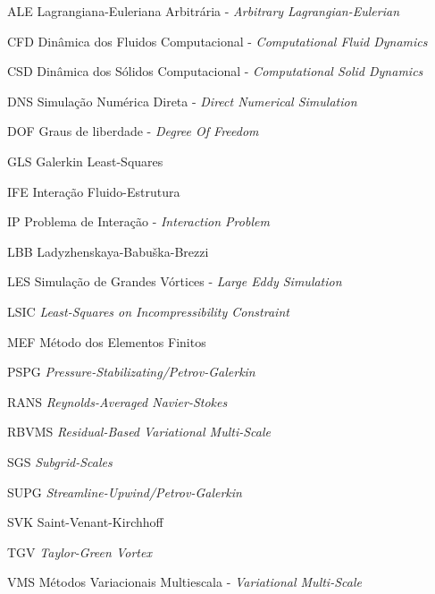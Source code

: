 \begin{siglas}
    \item[ALE] Lagrangiana-Euleriana Arbitrária - \textit{Arbitrary Lagrangian-Eulerian}
    \item[CFD] Dinâmica dos Fluidos Computacional - \textit{Computational Fluid Dynamics}
    \item[CSD] Dinâmica dos Sólidos Computacional - \textit{Computational Solid Dynamics}
    \item[DNS] Simulação Numérica Direta - \textit{Direct Numerical Simulation}
    \item[DOF] Graus de liberdade - \textit{Degree Of Freedom}
    \item[GLS] Galerkin Least-Squares
    \item[IFE] Interação Fluido-Estrutura
    \item[IP] Problema de Interação - \textit{Interaction Problem}
    \item[LBB] Ladyzhenskaya-Babuška-Brezzi
    \item[LES] Simulação de Grandes Vórtices - \textit{Large Eddy Simulation}
    \item[LSIC] \textit{Least-Squares on Incompressibility Constraint}
    \item[MEF] Método dos Elementos Finitos
    \item[PSPG] \textit{Pressure-Stabilizating/Petrov-Galerkin}
    \item[RANS] \textit{Reynolds-Averaged Navier-Stokes}
    \item[RBVMS] \textit{Residual-Based Variational Multi-Scale}
    \item[SGS] \textit{Subgrid-Scales}
    \item[SUPG] \textit{Streamline-Upwind/Petrov-Galerkin}
    \item[SVK] Saint-Venant-Kirchhoff
    \item[TGV] \textit{Taylor-Green Vortex}
    \item[VMS] Métodos Variacionais Multiescala - \textit{Variational Multi-Scale}
\end{siglas}